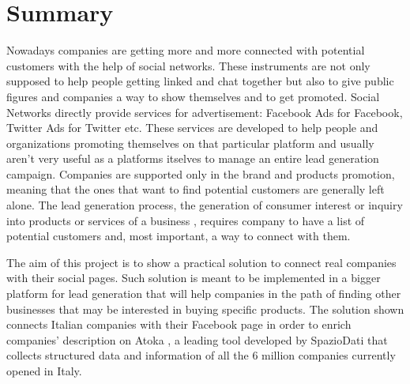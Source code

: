 \chapter*{Summary} %
\label{Summary}




Nowadays companies are getting more and more connected with potential customers with the help of social networks. These instruments are not only supposed to help people getting linked and chat together but also to give public figures and companies a way to show themselves and to get promoted. Social Networks directly provide services for advertisement: Facebook Ads for Facebook, Twitter Ads for Twitter etc. These services are developed to help people and organizations promoting themselves on that particular platform and usually aren't very useful as a platforms itselves to manage an entire lead generation campaign. Companies are supported only in the brand and products promotion, meaning that the ones that want to find potential customers are generally left alone. The lead generation process, the generation of consumer interest or inquiry into products or services of a business
, requires company to have a list of potential customers and, most important, a way to connect with them.



The aim of this project is to show a practical solution to connect real companies with their social pages.
Such solution is meant to be implemented in a bigger platform for lead generation that will help companies in the path of finding other businesses that may be interested in buying specific products. 
The solution shown connects Italian companies with their Facebook page in order to enrich companies' description on Atoka
, a leading tool developed by SpazioDati
 that collects structured data and information of all the 6 million companies currently opened in Italy.





